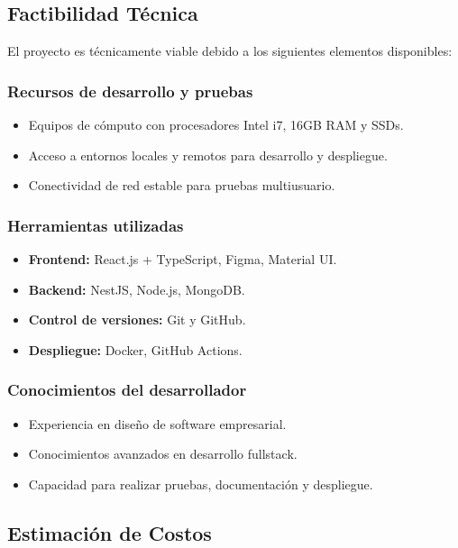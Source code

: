 \subsection{Factibilidad Técnica}

El proyecto es técnicamente viable debido a los siguientes elementos disponibles:

\subsubsection{Recursos de desarrollo y pruebas}
\begin{itemize}
    \item Equipos de cómputo con procesadores Intel i7, 16GB RAM y SSDs.
    \item Acceso a entornos locales y remotos para desarrollo y despliegue.
    \item Conectividad de red estable para pruebas multiusuario.
\end{itemize}

\subsubsection{Herramientas utilizadas}
\begin{itemize}
    \item \textbf{Frontend:} React.js + TypeScript, Figma, Material UI.
    \item \textbf{Backend:} NestJS, Node.js, MongoDB.
    \item \textbf{Control de versiones:} Git y GitHub.
    \item \textbf{Despliegue:} Docker, GitHub Actions.
\end{itemize}

\subsubsection{Conocimientos del desarrollador}
\begin{itemize}
    \item Experiencia en diseño de software empresarial.
    \item Conocimientos avanzados en desarrollo fullstack.
    \item Capacidad para realizar pruebas, documentación y despliegue.
\end{itemize}

\subsection{Estimación de Costos}

